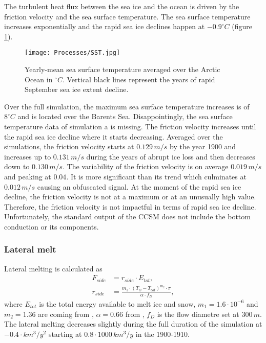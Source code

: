 The turbulent heat flux between the sea ice and the ocean is driven by the friction velocity and the sea surface temperature. The sea surface temperature increases exponentially and the rapid sea ice declines happen at $-0.9^\circ C$ (figure \ref{SSTg1}). 
\begin{figure}[t!]
\center
\noindent\texttt{[image: Processes/SST.jpg]}
\caption{Yearly-mean sea surface temperature averaged over the Arctic Ocean in $^\circ C$. Vertical black lines represent the years of rapid September sea ice extent decline.}
\label{SSTg1}
\end{figure}
Over the full simulation, the maximum sea surface temperature increases is of  $8^\circ C$ and is located over the Barents Sea. Disappointingly, the sea surface temperature data of simulation a is missing. The friction velocity increases until the rapid sea ice decline where it starts decreasing. Averaged over the simulations, the friction velocity starts at $0.129\,m/s$ by the year 1900 and increases up to $0.131\,m/s$ during the years of abrupt ice loss and then decreases down to $0.130\,m/s$. The variability of the friction velocity is on average $0.019\,m/s$ and peaking at $0.04$. It is more significant than its trend which culminates at $0.012\,m/s$ causing an obfuscated signal. At the moment of the rapid sea ice decline, the friction velocity is not at a maximum or at an unusually high value. Therefore, the friction velocity is not impactful in terms of rapid sea ice decline. Unfortunately, the standard output of the CCSM does not include the bottom conduction or its components.  









\subsubsection{Lateral melt}\label{Lmelt}

Lateral melting is calculated as 
\begin{align}
F_{side} &= r_{side} \cdot E_{tot}, \label{eqml1}\\
r_{side} &= \frac{m_1 \cdot (T_w - T_{bot})^{m_2} \cdot \pi}{\alpha \cdot f_D},\label{eqml2}
\end{align}
where $E_{tot}$ is the total energy available to melt ice and snow, $m_1 = 1.6\cdot 10^{-6}$ and $m_2 = 1.36$ are coming from \cite{MaykutPero1987}, $\alpha = 0.66$ from \cite{Steele1992}, $f_D$ is the flow diametre set at $300 \, m$. The lateral melting decreases slightly during the full duration of the simulation at  $-0.4 \cdot km^3/y^2$ starting at $0.8 \cdot 1000 \, km^3/y$ in the 1900-1910. 

